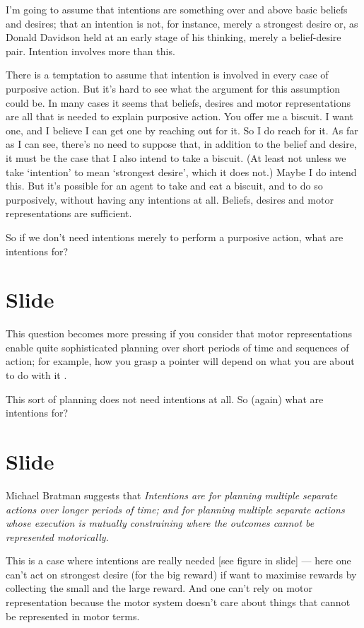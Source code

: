 \documentclass[12pt,\papersize]{extarticle}
\begin{document}
I’m going to assume that intentions are something over and above basic beliefs and desires; that an intention is not, for instance, merely a strongest desire or, as Donald Davidson held at an early stage of his thinking, merely a belief-desire pair.
Intention involves more than this.

There is a temptation to assume that intention is involved in every case of purposive action.
But it’s hard to see what the argument for this assumption could be.
In many cases it seems that beliefs, desires and motor representations are all that is needed to explain purposive action. 
You offer me a biscuit.  I want one, and I believe I can get one by reaching out for it.  So I do reach for it.  As far as I can see, there’s no need to suppose that, in addition to the belief and desire, it must be the case that I also intend to take a biscuit.  
(At least not unless we take ‘intention’ to mean ‘strongest desire’, which it does not.)  
Maybe I do intend this.  
But it’s possible for an agent to take and eat a biscuit, and to do so purposively, without having any intentions at all.  
Beliefs, desires and motor representations are sufficient.

So if we don't need intentions merely to perform a purposive action, what are intentions for?



\section{Slide}
This question becomes more pressing if you consider that motor representations enable quite sophisticated planning over short periods of time and sequences of action; for example, how you grasp a pointer will depend on what you are about to do with it \citep{zhang:2007_planning}.

This sort of planning does not need intentions at all.  So (again) what are intentions for?



\section{Slide}
Michael Bratman suggests that 
\emph{Intentions are for planning multiple separate actions over longer periods of time; and for planning multiple separate actions whose execution is mutually constraining where the outcomes cannot be represented motorically.}

This is a case where intentions are really needed [see figure in slide] --- here one can’t act on strongest desire (for the big reward) if want to maximise rewards by collecting the small and the large reward.
And one can’t rely on motor representation because the motor system doesn’t care about things that cannot be represented in motor terms.
\end{document}

